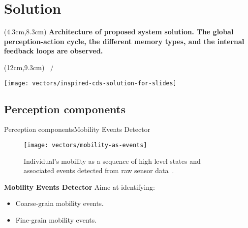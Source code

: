 \section{Solution}
{\aauwavesbg%
\begin{frame}[plain]
  \begin{textblock*}{8.5cm}(4.3cm,8.3cm)
  \small
  \textbf{Architecture of proposed system solution. The global perception-action cycle, the different memory types, and the internal feedback loops are observed.}
  \end{textblock*}

  \begin{textblock*}{1cm}(12cm,9.3cm)
  \scriptsize
  \insertframenumber~/~\inserttotalframenumber
  \end{textblock*}

  \centering
  \texttt{[image: vectors/inspired-cds-solution-for-slides]}
\end{frame}}
    

\subsection{Perception components}
\begin{frame}{Perception components}{Mobility Events Detector}
\small
\begin{figure}
    \texttt{[image: vectors/mobility-as-events]}
    \caption{Individual's mobility as a sequence of high level states and associated events detected from raw sensor data~\cite{Alessandretti2017,Wang2014}.}
\end{figure}

\begin{block}{\small \textbf{Mobility Events Detector}} 
Aime at identifying:
\begin{itemize}
    \item Coarse-grain mobility events.
    \item Fine-grain mobility events.
\end{itemize}
\end{block}
\end{frame}

